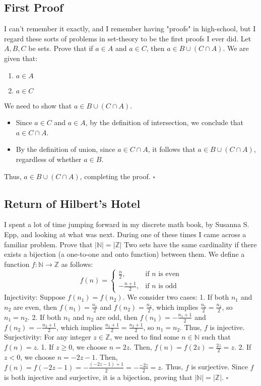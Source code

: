 \documentclass{article}
\begin{document}
\subsection*{First Proof}
I can't remember it exactly, and I remember having "proofs" in high-school, but I regard these sorts of problems in set-theory to be the first proofs I ever did.
Let \( A, B, C \) be sets. Prove that if \( a \in A \) and \( a \in C \), then \( a \in B \cup (C \cap A) \).
We are given that:
\begin{enumerate}
    \item \( a \in A \)
    \item \( a \in C \)
\end{enumerate}
We need to show that \( a \in B \cup (C \cap A) \).
\begin{itemize}
    \item Since \( a \in C \) and \( a \in A \), by the definition of intersection, we conclude that \( a \in C \cap A \).
    \item By the definition of union, since \( a \in C \cap A \), it follows that \( a \in B \cup (C \cap A) \), regardless of whether \( a \in B \).
\end{itemize}
Thus, \( a \in B \cup (C \cap A) \), completing the proof. \(\square\)

\subsection*{Return of Hilbert's Hotel}
I spent a lot of time jumping forward in my discrete math book, by Susanna S. Epp, and looking at what was next.
During one of these times I came across a familiar problem.
Prove that \( |\mathbb{N}| = |\mathbb{Z}| \)
Two sets have the same cardinality if there exists a bijection (a one-to-one and onto function) between them. We define a function \( f: \mathbb{N} \to \mathbb{Z} \) as follows:
\[
f(n) =
\begin{cases} 
\frac{n}{2}, & \text{if } n \text{ is even} \\ 
-\frac{n+1}{2}, & \text{if } n \text{ is odd} 
\end{cases}
\]
Injectivity:
Suppose \( f(n_1) = f(n_2) \). We consider two cases:
1. If both \( n_1 \) and \( n_2 \) are even, then \( f(n_1) = \frac{n_1}{2} \) and \( f(n_2) = \frac{n_2}{2} \), which implies \( \frac{n_1}{2} = \frac{n_2}{2} \), so \( n_1 = n_2 \).
2. If both \( n_1 \) and \( n_2 \) are odd, then \( f(n_1) = -\frac{n_1+1}{2} \) and \( f(n_2) = -\frac{n_2+1}{2} \), which implies \( \frac{n_1+1}{2} = \frac{n_2+1}{2} \), so \( n_1 = n_2 \).
Thus, \( f \) is injective.
Surjectivity:
For any integer \( z \in \mathbb{Z} \), we need to find some \( n \in \mathbb{N} \) such that \( f(n) = z \).
1. If \( z \geq 0 \), we choose \( n = 2z \). Then, \( f(n) = f(2z) = \frac{2z}{2} = z \).
2. If \( z < 0 \), we choose \( n = -2z - 1 \). Then, \( f(n) = f(-2z - 1) = -\frac{(-2z - 1) + 1}{2} = -\frac{-2z}{2} = z \).
Thus, \( f \) is surjective.
Since \( f \) is both injective and surjective, it is a bijection, proving that \( |\mathbb{N}| = |\mathbb{Z}| \). \(\square\)
\end{document}
